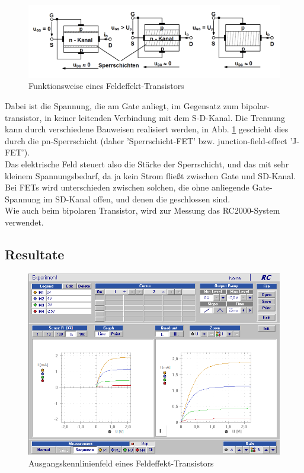 \documentclass[12pt,a4paper]{article}
\begin{document}
\begin{figure}[H]
	\centering
	\includegraphics[scale=1]{./data/FET_skizze.png}
	\caption{Funktionsweise eines Feldeffekt-Transistors}
	\label{fig:FET_skizze}
\end{figure}
\begin{multicols}{2}

\noindent
Dabei ist die Spannung, die am Gate anliegt, im Gegensatz zum bipolar-transistor, in keiner leitenden Verbindung mit dem S-D-Kanal. Die Trennung kann durch verschiedene Bauweisen realisiert werden, in Abb. \ref{fig:FET_skizze} geschieht dies durch die pn-Sperrschicht (daher 'Sperrschicht-FET' bzw. junction-field-effect 'J-FET').\\
Das elektrische Feld steuert also die Stärke der Sperrschicht, und das mit sehr kleinem Spannungsbedarf, da ja kein Strom fließt zwischen Gate und SD-Kanal.\\
Bei FETs wird unterschieden zwischen solchen, die ohne anliegende Gate-Spannung im SD-Kanal offen, und denen die geschlossen sind.\\
\noindent
Wie auch beim bipolaren Transistor, wird zur Messung das RC2000-System verwendet.


\subsection{Resultate}

\end{multicols}

\begin{figure}[H]
	\centering
	\includegraphics[scale=0.45]{./data/Braun_Kurz_PS8/FET_Ausgangskennlinien.png}
	\caption{Ausgangskennlinienfeld eines Feldeffekt-Transistors}
	\label{fig:ausgangskennlinienfeld_fet}
\end{figure}
\end{document}
